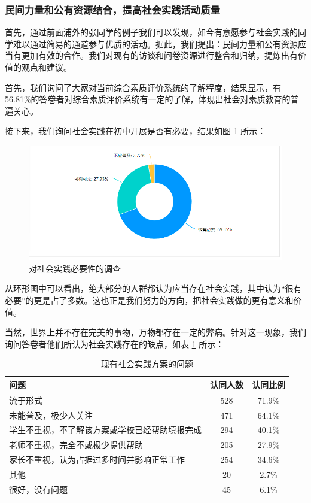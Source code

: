 \documentclass[12pt,UTF8]{ctexart}
\begin{document}
\subsubsection {民间力量和公有资源结合，提高社会实践活动质量}
\par {
	
	首先，通过前面浦外的张同学的例子我们可以发现，如今有意愿参与社会实践的同学难以通过简易的通道参与优质的活动。据此，我们提出：民间力量和公有资源应当有更加有效的合作。我们对现有的访谈和问卷资源进行整合和归纳，提炼出有价值的观点和建议。
}
\par {
	首先，我们询问了大家对当前综合素质评价系统的了解程度，结果显示，有56.81\%的答卷者对综合素质评价系统有一定的了解，体现出社会对素质教育的普遍关心。
}
\par {
	接下来，我们询问社会实践在初中开展是否有必要，结果如图 \ref{fig:9} 所示：
}
\begin{figure}[!htb]
	\centering
	\includegraphics[width=4.6in]{chart/9.png}
	\caption{对社会实践必要性的调查}
	\label{fig:9}
\end{figure}
\par {
	从环形图中可以看出，绝大部分的人群都认为应当存在社会实践，其中认为“很有必要”的更是占了多数。这也正是我们努力的方向，把社会实践做的更有意义和价值。
}
\par {
	当然，世界上并不存在完美的事物，万物都存在一定的弊病。针对这一现象，我们询问答卷者他们所认为社会实践存在的缺点，如表 \ref{fig:10} 所示：
	\begin{table}[htbp]
		\centering
		\caption{现有社会实践方案的问题}
		\label{fig:10}
		\begin{tabular}{lcc}
			\hline
			\hline
			{\bf 问题} & {\bf 认同人数} & {\bf 认同比例}\\ \hline
			流于形式 & 528 & 71.9\% \\
			未能普及，极少人关注 & 471 & 64.1\% \\
			学生不重视，不了解该方案或学校已经帮助填报完成 & 294 & 40.1\% \\
			老师不重视，完全不或极少提供帮助 & 205 & 27.9\% \\
			家长不重视，认为占据过多时间并影响正常工作 & 254 & 34.6\% \\
			其他 & 20 & 2.7\% \\
			很好，没有问题 & 45 & 6.1\% \\
			\hline
			\hline
		\end{tabular}
	\end{table}
}
\end{document}
